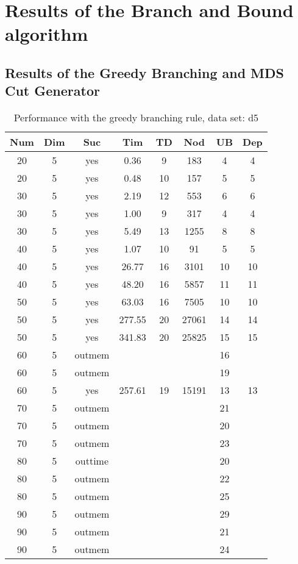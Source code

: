 \section{Results of the Branch and Bound algorithm}
\label{sec:apd.bac}

\subsection{Results of the Greedy Branching and MDS Cut Generator}
\label{sec:apd.bac.gre}

\begin{table}[!htb]
  \centering
  \begin{tabular}[center]{|c|c|c|c|c|c|c|c|}
    \hline
    Num & Dim & Suc & Tim & TD & Nod & UB & Dep \\
    \hline
    20 & 5 & yes & 0.36 & 9 & 183 & 4 & 4 \\
    20 & 5 & yes & 0.48 & 10 & 157 & 5 & 5 \\
    30 & 5 & yes & 2.19 & 12 & 553 & 6 & 6 \\
    30 & 5 & yes & 1.00 & 9 & 317 & 4 & 4 \\
    30 & 5 & yes & 5.49 & 13 & 1255 & 8 & 8 \\
    40 & 5 & yes & 1.07 & 10 & 91 & 5 & 5 \\
    40 & 5 & yes & 26.77 & 16 & 3101 & 10 & 10 \\
    40 & 5 & yes & 48.20 & 16 & 5857 & 11 & 11 \\
    50 & 5 & yes & 63.03 & 16 & 7505 & 10 & 10 \\
    50 & 5 & yes & 277.55 & 20 & 27061 & 14 & 14 \\
    50 & 5 & yes & 341.83 & 20 & 25825 & 15 & 15 \\
    60 & 5 & outmem &&&& 16 &\\
    60 & 5 & outmem &&&& 19 &\\
    60 & 5 & yes & 257.61 & 19 & 15191 & 13 & 13 \\
    70 & 5 & outmem &&&& 21 &\\
    70 & 5 & outmem &&&& 20 &\\
    70 & 5 & outmem &&&& 23 &\\
    80 & 5 & outtime &&&& 20 &\\
    80 & 5 & outmem &&&& 22 &\\
    80 & 5 & outmem &&&& 25 &\\
    90 & 5 & outmem &&&& 29 &\\
    90 & 5 & outmem &&&& 21 &\\
    90 & 5 & outmem &&&& 24 &\\
    \hline
  \end{tabular}
  \caption{Performance with the greedy branching rule, data set: d5}
  \label{tab:test.cutmds-d5}
\end{table}

